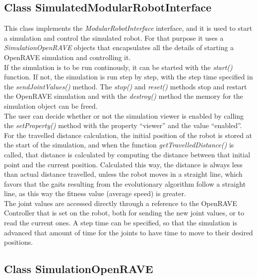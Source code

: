 \subsection{Class SimulatedModularRobotInterface}
\label{software_class_simulatedmodularrobotinterface}

This class implements the \emph{ModularRobotInterface} interface, and it is used to start a simulation and control the simulated robot. For that purpose it uses a \emph{SimulationOpenRAVE} objects that encapsulates all the details of starting a OpenRAVE simulation and controlling it. \\

If the simulation is to be run continously, it can be started with the \emph{start()} function. If not, the simulation is run step by step, with the step time specified in the \emph{sendJointValues()} method. The \emph{stop()} and \emph{reset()} methods stop and restart the OpenRAVE simulation and with the \emph{destroy()} method the memory for the simulation object can be freed.\\

The user can decide whether or not the simulation viewer is enabled by calling the \emph{setProperty()} method with the property ``viewer'' and the value ``enabled''.\\

For the travelled distance calculation, the initial position of the robot is stored at the start of the simulation, and when the function \emph{getTravelledDistance()} is called, that distance is calculated by computing the distance between that initial point and the current position. Calculated this way, the distance is always less than actual distance travelled, unless the robot moves in a straight line, which favors that the gaits resulting from the evolutionary algorithm follow a straight line, as this way the fitness value (average speed) is greater. \\

The joint values are accessed directly through a reference to the OpenRAVE Controller that is set on the robot, both for sending the new joint values, or to read the current ones. A step time can be specified, so that the simulation is advanced that amount of time for the joints to have time to move to their desired positions.\\

\subsection{Class SimulationOpenRAVE}
\label{software_class_SimulationOpenRAVE}

